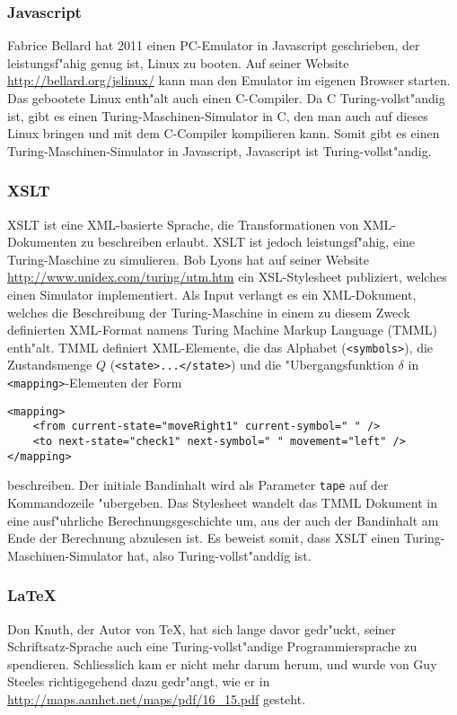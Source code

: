 \subsubsection{Javascript}
Fabrice Bellard hat 2011 einen PC-Emulator in Javascript geschrieben, der
leistungsf"ahig genug ist, Linux zu booten. Auf seiner Website
\url{http://bellard.org/jslinux/} kann man den Emulator im eigenen Browser
starten. Das gebootete Linux enth"alt auch einen C-Compiler. Da C
Turing-vollst"andig ist, gibt es einen Turing-Maschinen-Simulator in
C, den man auch auf dieses Linux bringen und mit dem C-Compiler
kompilieren kann. Somit gibt es einen Turing-Maschinen-Simulator in
Javascript, Javascript ist Turing-vollst"andig.

\subsubsection{XSLT}
XSLT ist eine XML-basierte Sprache, die Transformationen von XML-Dokumenten
zu beschreiben erlaubt. XSLT ist jedoch leistungsf"ahig, eine Turing-Maschine
zu simulieren. Bob Lyons hat auf seiner Website
\url{http://www.unidex.com/turing/utm.htm} ein XSL-Stylesheet publiziert,
welches einen Simulator implementiert. Als Input verlangt es
ein
XML-Dokument, welches die Beschreibung der Turing-Maschine in einem
zu diesem Zweck definierten XML-Format namens Turing Machine Markup
Language (TMML) enth"alt. TMML definiert XML-Elemente, die das Alphabet
(\verb+<symbols>+),
die Zustandsmenge $Q$ (\verb+<state>...</state>+)
und die "Ubergangsfunktion $\delta$ in \verb+<mapping>+-Elementen
der Form
\begin{verbatim}
<mapping>
    <from current-state="moveRight1" current-symbol=" " />
    <to next-state="check1" next-symbol=" " movement="left" />
</mapping>
\end{verbatim}
beschreiben. Der initiale Bandinhalt wird als Parameter \verb+tape+
auf der Kommandozeile "ubergeben.
Das Stylesheet wandelt das TMML Dokument in eine ausf"uhrliche
Berechnungsgeschichte um, aus der auch der Bandinhalt am Ende der Berechnung
abzulesen ist. Es beweist somit, dass XSLT einen Turing-Maschinen-Simulator
hat, also Turing-vollst"anddig ist.

\subsubsection{\LaTeX}
Don Knuth, der Autor von \TeX, hat sich lange davor gedr"uckt, seiner
Schriftsatz-Sprache auch eine Turing-vollst"andige Programmiersprache
zu spendieren. Schliesslich kam er nicht mehr darum herum, und wurde
von Guy Steeles richtigegehend dazu gedr"angt, wie er in
\url{http://maps.aanhet.net/maps/pdf/16\_15.pdf}
gesteht.

